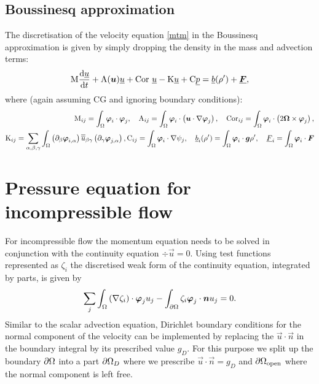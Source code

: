 \subsection{Boussinesq approximation}

The discretisation of the velocity equation \eqref{mtm}
in the Boussinesq approximation is given by simply
dropping the density in the mass and advection terms:
\begin{equation*}
  \mathrm{M} \frac{\mathrm{d}\underline{u}}{\mathrm{d} t}
    +\mathrm{A}({\mbox{\boldmath$u$}})\underline{u}
    +\mathrm{Cor}~\underline{u}
    -\mathrm{K}\underline{u}
    +\mathrm{C} \underline{p}
    =\underline{b}(\rho')+\underline{{\mbox{\boldmath$F$}}},
\end{equation*}
where (again assuming CG and ignoring boundary conditions):
\begin{equation*}
\begin{split}
  \mathrm{M}_{ij}=\int_\Omega {\mbox{\boldmath$\varphi$}}_i\cdot{\mbox{\boldmath$\varphi$}}_j, \quad
  \mathrm{A}_{ij}=\int_\Omega {\mbox{\boldmath$\varphi$}}_i\cdot\left({\mbox{\boldmath$u$}}\cdot\nabla {\mbox{\boldmath$\varphi$}}_j\right), \quad
  \mathrm{Cor}_{ij}=
    \int_\Omega {\mbox{\boldmath$\varphi$}}_i\cdot\left(2{\mbox{\boldmath$\Omega$}}\times{\mbox{\boldmath$\varphi$}}_j\right), \\
  \mathrm{K}_{ij}=\sum_{\alpha,\beta,\gamma} \int_\Omega
    \left(\partial_\beta{\mbox{\boldmath$\varphi$}}_{i,\alpha}\right) \overline{\overline{u}}_{\beta\gamma}
      \left(\partial_\gamma {\mbox{\boldmath$\varphi$}}_{j,\alpha}\right),
  \mathrm{C}_{ij}=\int_\Omega {\mbox{\boldmath$\varphi$}}_i\cdot\nabla\psi_j, \quad
    \underline{b}_i(\rho')=\int_\Omega {\mbox{\boldmath$\varphi$}}_i\cdot{\mbox{\boldmath$g$}}\rho',\quad
    \underline{F}_i=\int_\Omega {\mbox{\boldmath$\varphi$}}_i \cdot{\mbox{\boldmath$F$}}
\end{split}
\end{equation*}

\section{Pressure equation for incompressible flow}
\label{sec:ND_pressure_equation}

For incompressible flow the momentum equation needs to be solved
in conjunction with the continuity equation
$\div\vec u=0$. Using test functions represented as $\zeta_{i}$ the discretised
weak form of the continuity equation, integrated by parts, is given by
\begin{equation*}
  \sum_j \int_\Omega \left(\nabla\zeta_i\right)\cdot{\mbox{\boldmath$\varphi$}}_j u_j -
    \int_{\partial\Omega} \zeta_i{\mbox{\boldmath$\varphi$}}_j\cdot{\mbox{\boldmath$n$}} u_j = 0.
  \label{continuity_byparts}
\end{equation*}
Similar to the scalar advection equation, Dirichlet boundary conditions for the
normal component of the velocity can be implemented by replacing
the $\vec u\cdot\vec n$ in the boundary integral by its prescribed
value $g_D$. For this purpose we split up the
boundary ${\partial\Omega}$ into a part
${\partial\Omega}_D$ where we prescribe $\vec u\cdot\vec n=g_D$ and
${\partial\Omega}_{\mathrm{open}}$ where the normal component is left free.

